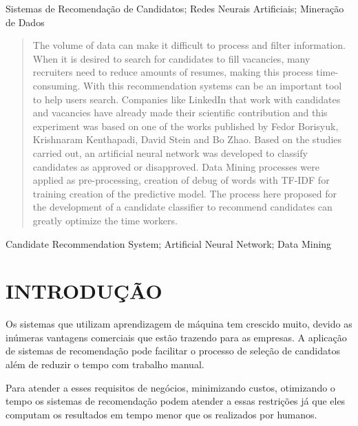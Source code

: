 \documentclass[conference]{IEEEtran}
\begin{document}
\begin{IEEEkeywords}
Sistemas de Recomendação de Candidatos; Redes Neurais Artificiais; Mineração de Dados
\end{IEEEkeywords}
\begin{abstract}
    The volume of data can make it difficult to process and filter information. When it is desired to search for candidates to fill vacancies, many recruiters need to reduce amounts of resumes, making this process time-consuming. With this recommendation systems can be an important tool to help users search. Companies like LinkedIn that work with candidates and vacancies have already made their scientific contribution and this experiment was based on one of the works published by Fedor Borisyuk, Krishnaram Kenthapadi, David Stein and Bo Zhao. Based on the studies carried out, an artificial neural network was developed to classify candidates as approved or disapproved. Data Mining processes were applied as pre-processing, creation of debug of words with TF-IDF for training creation of the predictive model. The process here proposed for the development of a candidate classifier to recommend candidates can greatly optimize the time workers.

\end{abstract}
\begin{IEEEkeywords}

Candidate Recommendation System; Artificial Neural Network; Data Mining
\end{IEEEkeywords}

\section{INTRODUÇÃO}


    Os sistemas que utilizam aprendizagem de máquina tem crescido muito, devido as inúmeras vantagens comerciais que estão trazendo para as empresas. A aplicação de sistemas de recomendação pode facilitar o processo de seleção de candidatos além de reduzir o tempo com trabalho manual. 
    
    Para atender a esses requisitos de negócios, minimizando custos, otimizando o tempo os sistemas de recomendação podem atender a essas restrições já que eles computam os resultados em tempo menor que os realizados por humanos.
    
\end{document}
